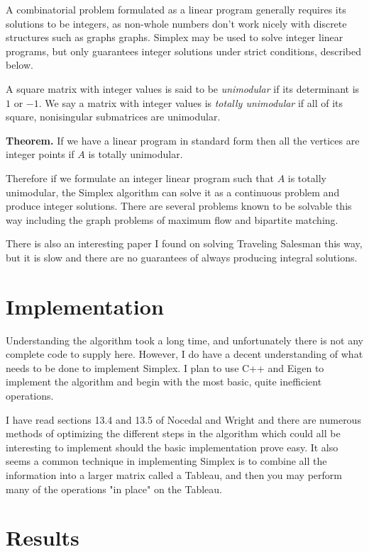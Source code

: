 \documentclass[12pt]{amsart}
\begin{document}
A combinatorial problem formulated as a linear program generally requires
its solutions to be integers, as non-whole numbers don't work nicely with
discrete structures such as graphs graphs. Simplex may be used to solve integer
linear programs, but only guarantees integer solutions under strict conditions,
described below.

A square matrix with integer values is said to be \emph{unimodular} if its determinant
is $1$ or $-1$. We say a matrix with integer values is \emph{totally unimodular}
if all of its square, nonisingular submatrices are unimodular.

\textbf{Theorem.} \cite{steiglitz} If we have
a linear program in standard form then all the vertices are integer points if
$A$ is totally unimodular.

Therefore if we formulate an integer linear program such that $A$ is totally
unimodular, the Simplex algorithm can solve it as a continuous problem and
produce integer solutions. There are several problems known to be solvable this
way including the graph problems of maximum flow and bipartite matching.

There is also an interesting paper \cite{dantzig} I found on solving Traveling
Salesman this way, but it is slow and there are no guarantees of always
producing integral solutions.


\section{Implementation}

Understanding the algorithm took a long time, and unfortunately there is not
any complete code to supply here. However, I do have a decent understanding of
what needs to be done to implement Simplex. I plan to use C++ and Eigen to implement
the algorithm and begin with the most basic, quite inefficient operations.

I have read sections
13.4 and 13.5 of Nocedal and Wright and there are numerous methods of optimizing
the different steps in the algorithm which could all be interesting to implement
should the basic implementation prove easy. It also seems a common technique in
implementing Simplex is to combine all the information into a larger matrix
called a Tableau, and then you may perform many of the operations "in place" on
the Tableau.

\section{Results}
\end{document}
